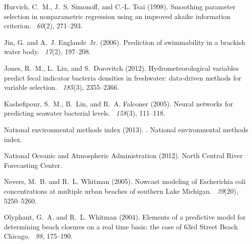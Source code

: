 \documentclass[authoryear,review, 12pt]{elsarticle}
\begin{document}
\begin{thebibliography}{}
Hurvich, C.~M., J.~S. Simonoff, and C.-L. Tsai (1998).
\newblock Smoothing parameter selection in nonparametric regression using an
  improved akaike information criterion.
~{\em 60\/}(2), 271--293.

Jin, G. and A.~J. Englande~Jr. (2006).
\newblock Prediction of swimmability in a brackish water body.
~{\em 17\/}(2), 197--208.

Jones, R.~M., L.~Liu, and S.~Dorovitch (2012).
\newblock Hydrometeorological variables predict fecal indicator bacteria
  densities in freshwater: data-driven methods for variable selection.
~{\em 185\/}(3),
  2355--2366.

Kashefipour, S.~M., B.~Lin, and R.~A. Falconer (2005).
\newblock Neural networks for predicting seawater bacterial levels.
~{\em 158\/}(3), 111--118.

National environmental methods index (2013).
.
\newblock National environmental methods index.

{National Oceanic and Atmospheric Administration} (2012).
\newblock North {C}entral {R}iver {F}orecasting {C}enter.

Nevers, M.~B. and R.~L. Whitman (2005).
\newblock Nowcast modeling of {E}scherichia coli concentrations at multiple
  urban beaches of southern {Lake Michigan}.
~{\em 39\/}(20), 5250--5260.

Olyphant, G.~A. and R.~L. Whitman (2004).
\newblock Elements of a predictive model for determining beach closures on a
  real time basis: the case of 63rd {S}treet {B}each {C}hicago.
~{\em 98}, 175--190.


\end{thebibliography}
\end{document}
